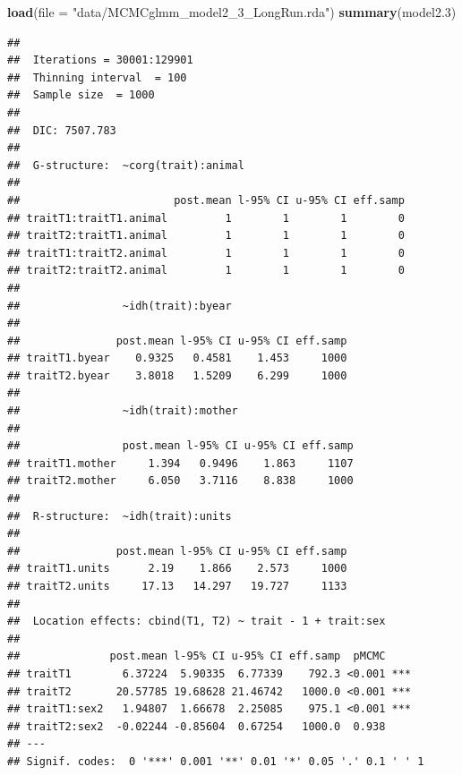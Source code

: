 \documentclass[
  12pt,
]{book}
\newenvironment{Shaded}{\begin{snugshade}}{\end{snugshade}}
\newcommand{\DataTypeTok}[1]{\textcolor[rgb]{0.13,0.29,0.53}{#1}}
\newcommand{\DecValTok}[1]{\textcolor[rgb]{0.00,0.00,0.81}{#1}}
\newcommand{\FloatTok}[1]{\textcolor[rgb]{0.00,0.00,0.81}{#1}}
\newcommand{\KeywordTok}[1]{\textcolor[rgb]{0.13,0.29,0.53}{\textbf{#1}}}
\newcommand{\NormalTok}[1]{#1}
\newcommand{\OperatorTok}[1]{\textcolor[rgb]{0.81,0.36,0.00}{\textbf{#1}}}
\newcommand{\StringTok}[1]{\textcolor[rgb]{0.31,0.60,0.02}{#1}}
\begin{document}
\begin{Shaded}
\begin{Highlighting}[]
\KeywordTok{load}\NormalTok{(}\DataTypeTok{file =} \StringTok{"data/MCMCglmm\_model2\_3\_LongRun.rda"}\NormalTok{)}
\KeywordTok{summary}\NormalTok{(model2}\FloatTok{.3}\NormalTok{)}
\end{Highlighting}
\end{Shaded}

\begin{verbatim}
## 
##  Iterations = 30001:129901
##  Thinning interval  = 100
##  Sample size  = 1000 
## 
##  DIC: 7507.783 
## 
##  G-structure:  ~corg(trait):animal
## 
##                        post.mean l-95% CI u-95% CI eff.samp
## traitT1:traitT1.animal         1        1        1        0
## traitT2:traitT1.animal         1        1        1        0
## traitT1:traitT2.animal         1        1        1        0
## traitT2:traitT2.animal         1        1        1        0
## 
##                ~idh(trait):byear
## 
##               post.mean l-95% CI u-95% CI eff.samp
## traitT1.byear    0.9325   0.4581    1.453     1000
## traitT2.byear    3.8018   1.5209    6.299     1000
## 
##                ~idh(trait):mother
## 
##                post.mean l-95% CI u-95% CI eff.samp
## traitT1.mother     1.394   0.9496    1.863     1107
## traitT2.mother     6.050   3.7116    8.838     1000
## 
##  R-structure:  ~idh(trait):units
## 
##               post.mean l-95% CI u-95% CI eff.samp
## traitT1.units      2.19    1.866    2.573     1000
## traitT2.units     17.13   14.297   19.727     1133
## 
##  Location effects: cbind(T1, T2) ~ trait - 1 + trait:sex 
## 
##              post.mean l-95% CI u-95% CI eff.samp  pMCMC    
## traitT1        6.37224  5.90335  6.77339    792.3 <0.001 ***
## traitT2       20.57785 19.68628 21.46742   1000.0 <0.001 ***
## traitT1:sex2   1.94807  1.66678  2.25085    975.1 <0.001 ***
## traitT2:sex2  -0.02244 -0.85604  0.67254   1000.0  0.938    
## ---
## Signif. codes:  0 '***' 0.001 '**' 0.01 '*' 0.05 '.' 0.1 ' ' 1
\end{verbatim}

\begin{Shaded}
\end{Shaded}
\end{document}
